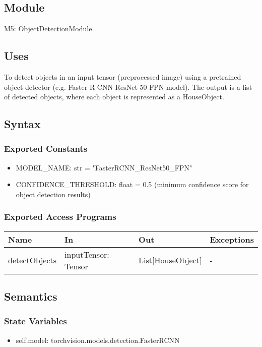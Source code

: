 \documentclass[12pt, titlepage]{article}
\begin{document}
\subsection{Module}

M5: ObjectDetectionModule

\subsection{Uses}
To detect objects in an input tensor (preprocessed image) using a pretrained object detector (e.g. Faster R-CNN ResNet-50 FPN model). The output is a list of detected objects, where each object is represented as a HouseObject.

\subsection{Syntax}

\subsubsection{Exported Constants}

\begin{itemize}
  \item MODEL{\_}NAME: str = "FasterRCNN{\_}ResNet50{\_}FPN"
  \item CONFIDENCE{\_}THRESHOLD: float = 0.5 (minimum confidence score for object detection results)
\end{itemize}

\subsubsection{Exported Access Programs}

\begin{center}
\begin{tabular}{p{5cm} p{3cm} p{3cm} p{2cm}}
\hline
\textbf{Name} & \textbf{In} & \textbf{Out} & \textbf{Exceptions} \\
\hline
detectObjects & inputTensor: Tensor & List[HouseObject] & - \\
\hline
\end{tabular}
\end{center}

\subsection{Semantics}

\subsubsection{State Variables}
\begin{itemize}
	\item self.model: torchvision.models.detection.FasterRCNN
\end{itemize}
\end{document}
